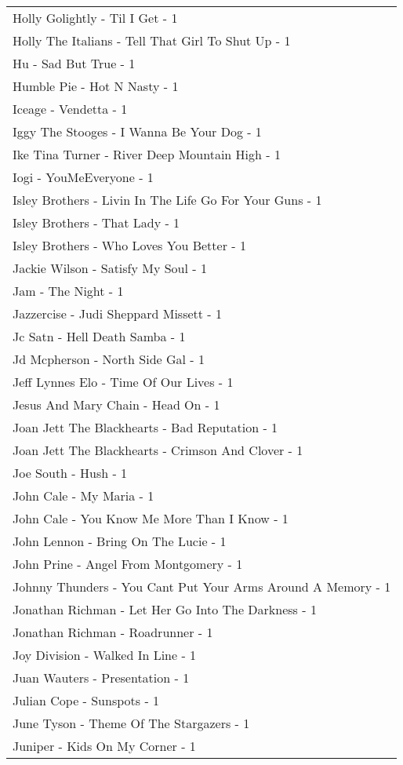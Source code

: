 \documentclass[
]{article}
\begin{document}
\begin{longtable}{l}
Holly Golightly - Til I Get - 1 \\ 
Holly The Italians - Tell That Girl To Shut Up - 1 \\ 
Hu - Sad But True - 1 \\ 
Humble Pie - Hot N Nasty - 1 \\ 
Iceage - Vendetta - 1 \\ 
Iggy The Stooges - I Wanna Be Your Dog - 1 \\ 
Ike Tina Turner - River Deep Mountain High - 1 \\ 
Iogi - YouMeEveryone - 1 \\ 
Isley Brothers - Livin In The Life Go For Your Guns - 1 \\ 
Isley Brothers - That Lady - 1 \\ 
Isley Brothers - Who Loves You Better - 1 \\ 
Jackie Wilson - Satisfy My Soul - 1 \\ 
Jam - The Night - 1 \\ 
Jazzercise - Judi Sheppard Missett - 1 \\ 
Jc Satn - Hell Death Samba - 1 \\ 
Jd Mcpherson - North Side Gal - 1 \\ 
Jeff Lynnes Elo - Time Of Our Lives - 1 \\ 
Jesus And Mary Chain - Head On - 1 \\ 
Joan Jett The Blackhearts - Bad Reputation - 1 \\ 
Joan Jett The Blackhearts - Crimson And Clover - 1 \\ 
Joe South - Hush - 1 \\ 
John Cale - My Maria - 1 \\ 
John Cale - You Know Me More Than I Know - 1 \\ 
John Lennon - Bring On The Lucie - 1 \\ 
John Prine - Angel From Montgomery - 1 \\ 
Johnny Thunders - You Cant Put Your Arms Around A Memory - 1 \\ 
Jonathan Richman - Let Her Go Into The Darkness - 1 \\ 
Jonathan Richman - Roadrunner - 1 \\ 
Joy Division - Walked In Line - 1 \\ 
Juan Wauters - Presentation - 1 \\ 
Julian Cope - Sunspots - 1 \\ 
June Tyson - Theme Of The Stargazers - 1 \\ 
Juniper - Kids On My Corner - 1 \\ 

\end{longtable}
\end{document}
